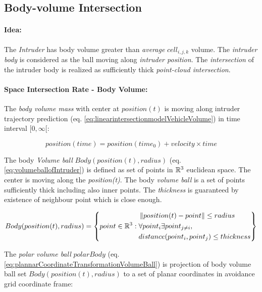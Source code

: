 \subsection{Body-volume Intersection}\label{s:bodyvolumeIntersection}
\paragraph{Idea:} The \emph{Intruder} has \empty body volume greater than \emph{average} $cell_{i,j,k}$ volume. The \emph{intruder body} is considered as the ball moving along \emph{intruder position}. The \emph{intersection} of the intruder body is realized as sufficiently thick \emph{point-cloud intersection}.

\paragraph{Space Intersection Rate - Body Volume:} The \emph{body volume mass} with center at $position(t)$ is moving along intruder trajectory prediction (eq. \ref{eq:linearintersectionmodelVehicleVolume}) in time interval $[0,\infty[$:

\begin{equation}\label{eq:linearintersectionmodelVehicleVolume}
    position(time) = position(time_0) + velocity \times time
\end{equation}

\noindent The body \emph{Volume ball} $Body(position(t),radius)$ (eq. \ref{eq:volumeballofIntruder}) is defined as set of points in $\mathbb{R}^3$ euclidean space. The center is moving along the \emph{position(t)}. The body \emph{volume ball} is a set of points sufficiently thick including also inner points. The \emph{thickness} is guaranteed by existence of neighbour point which is close enough.

\begin{equation}\label{eq:volumeballofIntruder}
    Body(position(t),radius) = \left\{point \in \mathbb{R}^3:\begin{aligned}&\left\lVert position(t) - point\right\rVert \le radius\\ &\forall point_i \exists point_{j\neq i},\\ &distance(point_i,point_j)\le thickness\end{aligned} \right\}
\end{equation}

\noindent The \emph{polar volume ball} $polarBody$ (eq. \ref{eq:plannarCoordinateTransformationVolumeBall}) is projection of body volume ball  set $Body(position(t),radius)$ to a set of planar coordinates in avoidance grid coordinate frame:

